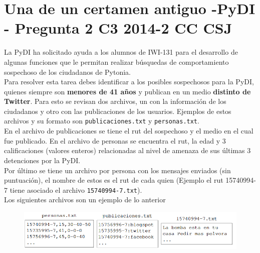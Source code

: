 \section{Una de un certamen antiguo -PyDI - Pregunta 2 C3 2014-2 CC CSJ}
La PyDI ha solicitado ayuda a los alumnos de IWI-131 para el desarrollo de algunas funciones que le permitan realizar búsquedas de comportamiento sospechoso de los ciudadanos de Pytonia.
\\
Para resolver esta tarea debes identificar a los posibles sospechosos para la PyDI, quienes siempre son \textbf{menores de 41 años} y publican en un medio \textbf{distinto de Twitter}. Para esto se revisan dos archivos, un con la información de los ciudadanos y otro con las publicaciones de los usuarios. Ejemplos de estos archivos y su formato son \texttt{publicaciones.txt} y \texttt{personas.txt}.
\\
En el archivo de publicaciones se tiene el rut del sospechoso y el medio en el cual fue publicado. En el archivo de personas se encuentra el rut, la edad y 3 calificaciones (valores enteros) relacionadas al nivel de amenaza de sus últimas 3 detenciones por la PyDI.
\\
Por último se tiene un archivo por persona con los mensajes enviados (sin puntuación), el nombre de estos es el rut de cada quien (Ejemplo el rut 15740994-7 tiene asociado el archivo \texttt{15740994-7.txt}).
\\Los siguientes archivos son un ejemplo de lo anterior

\begin{figure}[h]
    \centering
    \includegraphics[width=\textwidth]{Guia/terroristas.png}
\end{figure}

